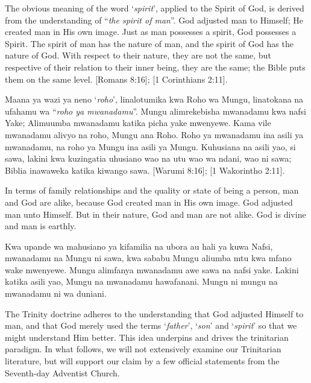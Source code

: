 The obvious meaning of the word ‘\textit{spirit}’, applied to the Spirit of God, is derived from the understanding of “\textit{the spirit of man}”. God adjusted man to Himself; He created man in His own image. Just as man possesses a spirit, God possesses a Spirit. The spirit of man has the nature of man, and the spirit of God has the nature of God. With respect to their nature, they are not the same, but respective of their relation to their inner being, they are the same; the Bible puts them on the same level. [Romans 8:16]; [1 Corinthians 2:11].


Maana ya wazi ya neno ‘\textit{roho}’, linalotumika kwa Roho wa Mungu, linatokana na ufahamu wa “\textit{roho ya mwanadamu}”. Mungu alimrekebisha mwanadamu kwa nafsi Yake; Alimuumba mwanadamu katika picha yake mwenyewe. Kama vile mwanadamu alivyo na roho, Mungu ana Roho. Roho ya mwanadamu ina asili ya mwanadamu, na roho ya Mungu ina asili ya Mungu. Kuhusiana na asili yao, si sawa, lakini kwa kuzingatia uhusiano wao na utu wao wa ndani, wao ni sawa; Biblia inawaweka katika kiwango sawa. [Warumi 8:16]; [1 Wakorintho 2:11].


In terms of family relationships and the quality or state of being a person, man and God are alike, because God created man in His own image. God adjusted man unto Himself. But in their nature, God and man are not alike. God is divine and man is earthly.


Kwa upande wa mahusiano ya kifamilia na ubora au hali ya kuwa Nafsi, mwanadamu na Mungu ni sawa, kwa sababu Mungu aliumba mtu kwa mfano wake mwenyewe. Mungu alimfanya mwanadamu awe sawa na nafsi yake. Lakini katika asili yao, Mungu na mwanadamu hawafanani. Mungu ni mungu na mwanadamu ni wa duniani.


The Trinity doctrine adheres to the understanding that God adjusted Himself to man, and that God merely used the terms ‘\textit{father}’, ‘\textit{son}’ and ‘\textit{spirit}’ so that we might understand Him better. This idea underpins and drives the trinitarian paradigm. In what follows, we will not extensively examine our Trinitarian literature, but will support our claim by a few official statements from the Seventh-day Adventist Church.


